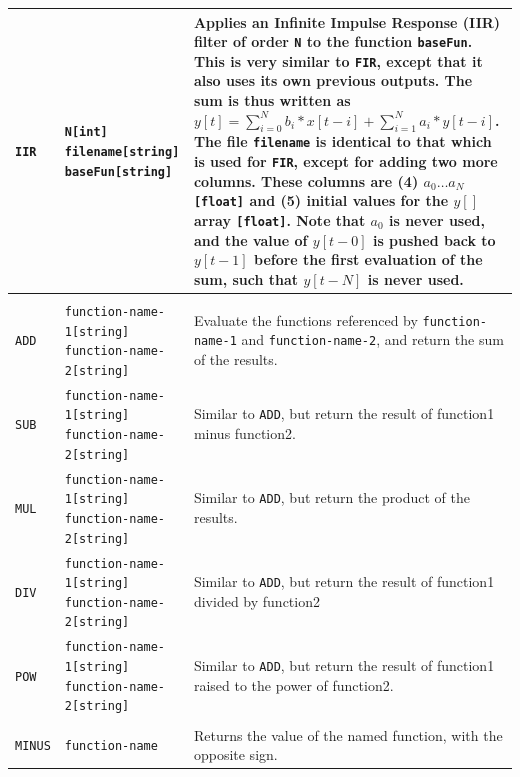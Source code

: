 \begin{center}
\begin{longtable}{|p{1.8cm} | p{4.1cm} | p{9.5cm}|}
    \texttt{IIR} & \texttt{N[int] filename[string] baseFun[string]} &
    Applies an Infinite Impulse Response\index{infinite impulse response} (IIR) filter of order \texttt{N} to the function \texttt{baseFun}.
    This is very similar to \texttt{FIR}, except that it also uses its own previous outputs.
    The sum is thus written as $y[t] = \sum_{i=0}^N b_i*x[t-i] + \sum_{i=1}^N a_i*y[t-i]$.
    The file \texttt{filename} is identical to that which is used for \texttt{FIR}, except for adding two more columns.
    These columns are (4) $a_0\ldots a_N$ \texttt{[float]} and (5) initial values for the $y[]$ array \texttt{[float]}.
    Note that $a_0$ is never used, and the value of $y[t-0]$ is pushed back to $y[t-1]$ before the first evaluation of the sum, such that $y[t-N]$ is never used.\\
    \hline

    \rowcolor{blue!15}
    \multicolumn{3}{|l|}{2-operand operators} \\*
    \hline

    \texttt{ADD} & \texttt{function-name-1[string] function-name-2[string]} &
    Evaluate the functions referenced by \texttt{function-name-1} and \texttt{function-name-2}, and return the sum of the results.\\*
    \hline

    \texttt{SUB} & \texttt{function-name-1[string] function-name-2[string]} &
    Similar to \texttt{ADD}, but return the result of function1 minus function2.\\*
    \hline

    \texttt{MUL} & \texttt{function-name-1[string] function-name-2[string]} &
    Similar to \texttt{ADD}, but return the product of the results. \\*
    \hline

    \texttt{DIV} & \texttt{function-name-1[string] function-name-2[string]} &
    Similar to \texttt{ADD}, but return the result of function1 divided by function2\\*
    \hline

    \texttt{POW} & \texttt{function-name-1[string] function-name-2[string]} &
    Similar to \texttt{ADD}, but return the result of function1 raised to the power of function2.\\
    \hline

    \rowcolor{blue!15}
    \multicolumn{3}{|l|}{1-operand operators} \\*
    \hline

    \texttt{MINUS} & \texttt{function-name} &
    Returns the value of the named function, with the opposite sign. \\*
    \hline


\end{longtable}
\end{center}
